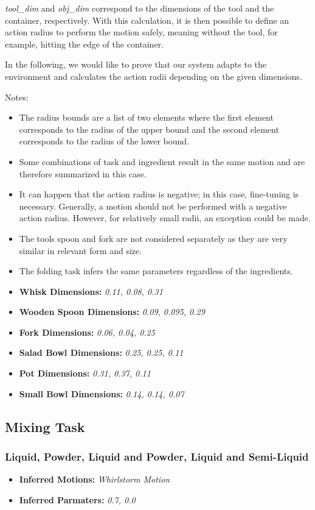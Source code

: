 \textit{tool\_dim} and \textit{obj\_dim} correspond to the dimensions of the tool and the container, respectively.
With this calculation, it is then possible to define an action radius to perform the motion safely, meaning without the tool, for example, hitting the edge of the container.

In the following, we would like to prove that our system adapts to the environment and calculates the action radii depending on the given dimensions.

Notes:
\begin{itemize}
    \item The radius bounds are a list of two elements where the first element corresponds to the radius of the upper bound and the second element corresponds to the radius of the lower bound.
    \item Some combinations of task and ingredient result in the same motion and are therefore summarized in this case.
    \item It can happen that the action radius is negative; in this case, fine-tuning is necessary. Generally, a motion should not be performed with a negative action radius. However, for relatively small radii, an exception could be made.
    \item The tools spoon and fork are not considered separately as they are very similar in relevant form and size.
    \item The folding task infers the same parameters regardless of the ingredients.
    \item \textbf{Whisk Dimensions:} \textit{0.11, 0.08, 0.31}
    \item \textbf{Wooden Spoon Dimensions:} \textit{0.09, 0.095, 0.29}
    \item \textbf{Fork Dimensions:} \textit{0.06, 0.04, 0.25}
    \item \textbf{Salad Bowl Dimensions:} \textit{0.25, 0.25, 0.11}
    \item \textbf{Pot Dimensions:} \textit{0.31, 0.37, 0.11}
    \item \textbf{Small Bowl Dimensions:} \textit{0.14, 0.14, 0.07}
\end{itemize}


\subsection{Mixing Task}
\subsubsection{Liquid, Powder, Liquid and Powder, Liquid and Semi-Liquid}
\begin{itemize}
    \item \textbf{Inferred Motions:} \textit{Whirlstorm Motion}
    \item \textbf{Inferred Parmaters:} \textit{0.7, 0.0}
\end{itemize}

